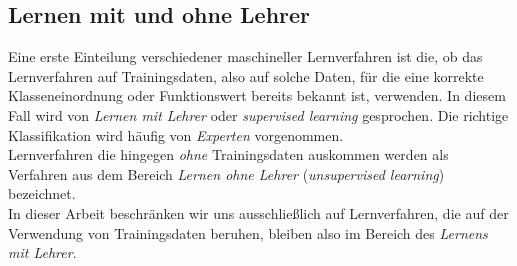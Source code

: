 \documentclass[fontsize=11pt]{scrartcl}
\begin{document}
            \subsection{Lernen mit und ohne Lehrer}
                Eine erste Einteilung verschiedener maschineller Lernverfahren ist die, ob das Lernverfahren auf Trainingsdaten, also auf solche Daten, für die eine korrekte Klasseneinordnung oder Funktionswert bereits bekannt ist, verwenden. In diesem Fall wird von \emph{Lernen mit Lehrer} oder \emph{supervised learning} gesprochen. Die richtige Klassifikation wird häufig von \emph{Experten} vorgenommen.\cite{ertel2016}
                \\
                Lernverfahren die hingegen \emph{ohne} Trainingsdaten auskommen werden als Verfahren aus dem Bereich \emph{Lernen ohne Lehrer} (\emph{unsupervised learning}) bezeichnet.\\
                In dieser Arbeit beschränken wir uns ausschließlich auf Lernverfahren, die auf der Verwendung von Trainingsdaten beruhen, bleiben also im Bereich des \emph{Lernens mit Lehrer}.
\end{document}
